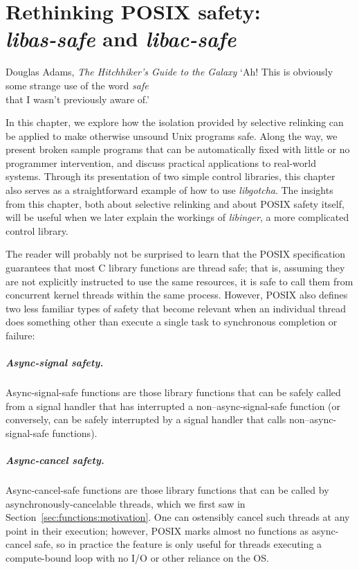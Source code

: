\chapter{Rethinking POSIX safety: \\ \textit{libas-safe} and \textit{libac-safe}}
\label{chap:safety}

\ifdefined\chapquotes
\vspace{-1in}
\begin{chapquote}[1.75in]{Douglas Adams, \textit{The Hitchhiker's Guide to the Galaxy}}
`Ah!  This is obviously some strange use of the word \textit{safe} \\
that I wasn't previously aware of.'
\end{chapquote}
\fi

In this chapter, we explore how the isolation provided by selective relinking can be
applied to make otherwise unsound Unix programs safe.  Along the way, we present
broken sample programs that can be automatically fixed with little or no programmer
intervention, and
discuss practical applications to real-world systems.  Through its presentation
of two simple control libraries, this chapter also serves as a straightforward
example of how to use \textit{libgotcha}.  The insights from this chapter, both about
selective relinking and about POSIX safety itself, will be useful when we later
explain the workings of \textit{libinger}, a more complicated control library.

The reader will probably not be surprised to learn that the POSIX specification
guarantees that most C library functions are thread safe; that is, assuming they are
not explicitly instructed to use the same resources, it is safe to call them from
concurrent kernel threads within the same process.  However, POSIX also defines two
less familiar types of safety that become relevant when an individual thread does
something other than execute a single task to synchronous completion or failure:

\paragraph{Async-signal safety.}
Async-signal-safe functions are those library functions that can be safely called
from a signal handler
that has interrupted a non--async-signal-safe function (or conversely, can be safely
interrupted by a signal handler that calls non--async-signal-safe functions).

\begin{sloppypar}
\paragraph{Async-cancel safety.}
Async-cancel-safe functions are those library functions that can be called by
asynchronously-cancelable threads, which we first saw in
Section~\ref{sec:functions:motivation}.  One can ostensibly cancel such threads at
any point in
their execution; however, POSIX marks almost no functions as async-cancel safe, so in
practice the feature is only useful for threads executing a compute-bound loop with
no I/O or other reliance on the OS.
\\
\end{sloppypar}

